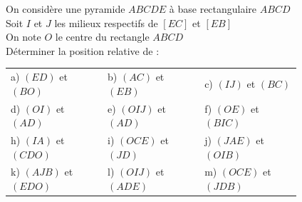 \documentclass[oneside,12pt]{book}          %
\begin{document}
\begin{minipage}{0.5\textwidth}
    On considère une pyramide $ABCDE$ à base rectangulaire $ABCD$\\
    Soit $I$ et $J$ les milieux respectifs de $[EC]$ et $[EB]$\\
    On note $O$ le centre du rectangle $ABCD$\\
    Déterminer la position relative de :
\end{minipage}
\hfill
\begin{minipage}{0.45\textwidth}
\end{minipage}

\begin{tabular}{p{0.27\linewidth}p{0.27\linewidth}p{0.27\linewidth}}
	a) $(ED)$ et $(BO)$ & b) $(AC)$ et $(EB)$ & c) $(IJ)$ et $(BC)$\\
	d) $(OI)$ et $(AD)$ & e) $(OIJ)$ et $(AD)$ & f) $(OE)$ et $(BIC)$ \\
	h) $(IA)$ et $(CDO)$ & i) $(OCE)$ et $(JD)$ & j) $(JAE)$ et $(OIB)$\\
	k) $(AJB)$ et $(EDO)$ & l) $(OIJ)$ et $(ADE)$ & m) $(OCE)$ et $(JDB)$
\end{tabular}
\end{document}
